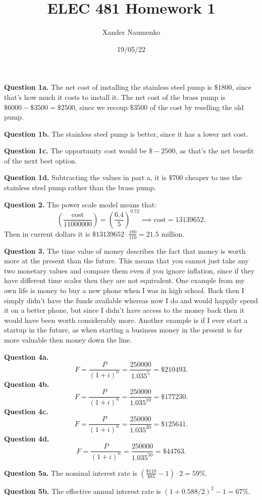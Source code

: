 \documentclass[letterpaper, reqno,11pt]{article}
\begin{document}
\title{ELEC 481 Homework 1}
\date{19/05/22}
\author{Xander Naumenko}
\maketitle

{\noindent\bf Question 1a.} The net cost of installing the stainless steel pump is $\$1800$, since that's how much it costs to install it. The net cost of the brass pump is $\$6000-\$3500=\$2500$, since we recoup $\$3500$ of the cost by reselling the old pump. 

{\noindent\bf Question 1b.} The stainless steel pump is better, since it has a lower net cost. 

{\noindent\bf Question 1c.} The opportunity cost would be $\$-2500$, as that's the net benefit of the next best option. 

{\noindent\bf Question 1d.} Subtracting the values in part a, it is $\$700$ cheaper to use the stainless steel pump rather than the brass pump. 

{\noindent\bf Question 2.} The power scale model means that: 
\[
    \left( \frac{\text{cost}}{11000000} \right) = \left( \frac{6.4}{5} \right)^{0.72}\implies\text{cost}=13139652
.\]
Then in current dollars it is $\$13139652\cdot \frac{180}{110}=21.5$ million. 

{\noindent\bf Question 3.} The time value of money describes the fact that money is worth more at the present than the future. This means that you cannot just take any two monetary values and compare them even if you ignore inflation, since if they have different time scales then they are not equivalent. One example from my own life is money to buy a new phone when I was in high school. Back then I simply didn't have the funds available whereas now I do and would happily spend it on a better phone, but since I didn't have access to the money back then it would have been worth considerably more. Another example is if I ever start a startup in the future, as when starting a business money in the present is far more valuable then money down the line. 

{\noindent\bf Question 4a.} 
\[
F=\frac{P}{(1+i)^{n}}=\frac{250000}{1.035^{5}}=\$210493
.\]
{\noindent\bf Question 4b.} 
\[
F=\frac{P}{(1+i)^{n}}=\frac{250000}{1.035^{10}}=\$177230
.\]
{\noindent\bf Question 4c.} 
\[
F=\frac{P}{(1+i)^{n}}=\frac{250000}{1.035^{20}}=\$125641
.\]
{\noindent\bf Question 4d.} 
\[
F=\frac{P}{(1+i)^{n}}=\frac{250000}{1.035^{50}}=\$44763
.\]

{\noindent\bf Question 5a.} The nominal interest rate is $(\frac{\$110}{\$85}-1)\cdot 2= 59\%$. 

{\noindent\bf Question 5b.} The effective annual interest rate is $(1+0.588 /2)^2-1= 67\%$. 
\end{document}
